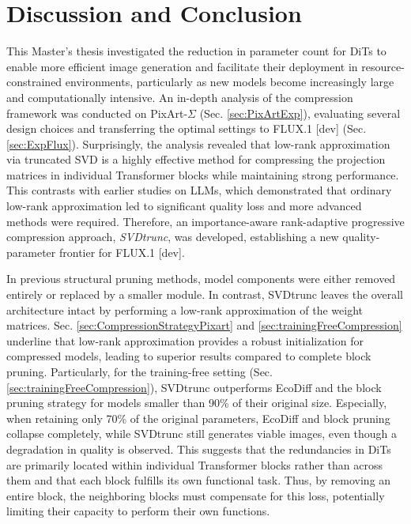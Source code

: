 \chapter{Discussion and Conclusion}
This Master's thesis investigated the reduction in parameter count for \gls{DiT}s to enable more efficient image generation and facilitate their deployment in resource-constrained environments, particularly as new models become increasingly large and computationally intensive. An in-depth analysis of the compression framework was conducted on PixArt-$\Sigma$ (Sec. \ref{sec:PixArtExp}), evaluating several design choices and transferring the optimal settings to FLUX.1 {[dev]} (Sec. \ref{sec:ExpFlux}). Surprisingly, the analysis revealed that low-rank approximation via truncated \gls{SVD} is a highly effective method for compressing the projection matrices in individual Transformer blocks while maintaining strong performance. This contrasts with earlier studies on \gls{LLM}s, which demonstrated that ordinary low-rank approximation led to significant quality loss and more advanced methods were required. Therefore, an importance-aware rank-adaptive progressive compression approach, \textit{SVDtrunc}, was developed, establishing a new quality-parameter frontier for FLUX.1 {[dev]}.


In previous structural pruning methods, model components were either removed entirely or replaced by a smaller module. In contrast, \gls{SVD}trunc leaves the overall architecture intact by performing a low-rank approximation of the weight matrices. Sec. \ref{sec:CompressionStrategyPixart} and \ref{sec:trainingFreeCompression} underline that low-rank approximation provides a robust initialization for compressed models, leading to superior results compared to complete block pruning. Particularly, for the training-free setting (Sec. \ref{sec:trainingFreeCompression}), \gls{SVD}trunc outperforms EcoDiff \cite{EcoDiff} and the block pruning strategy for models smaller than 90\% of their original size. Especially, when retaining only 70\% of the original parameters, EcoDiff and block pruning collapse completely, while \gls{SVD}trunc still generates viable images, even though a degradation in quality is observed. This suggests that the redundancies in \gls{DiT}s are primarily located within individual Transformer blocks rather than across them and that each block fulfills its own functional task. Thus, by removing an entire block, the neighboring blocks must compensate for this loss, potentially limiting their capacity to perform their own functions. 

